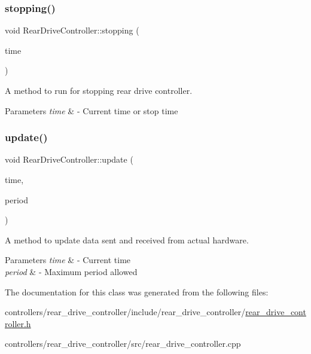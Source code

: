 \subsubsection{\texorpdfstring{stopping()}{stopping()}}
{\footnotesize\ttfamily void Rear\+Drive\+Controller\+::stopping (\begin{DoxyParamCaption}\item[{const ros\+::\+Time \&}]{time }\end{DoxyParamCaption})\hspace{0.3cm}{\ttfamily [inline]}}



A method to run for stopping rear drive controller. 


\begin{DoxyParams}{Parameters}
{\em time} & -\/ Current time or stop time \\
\hline
\end{DoxyParams}
\mbox{\label{classRearDriveController_a1990896d6d56922ed2f0d3097a9ea5e4}} 
\subsubsection{\texorpdfstring{update()}{update()}}
{\footnotesize\ttfamily void Rear\+Drive\+Controller\+::update (\begin{DoxyParamCaption}\item[{const ros\+::\+Time \&}]{time,  }\item[{const ros\+::\+Duration \&}]{period }\end{DoxyParamCaption})}



A method to update data sent and received from actual hardware. 


\begin{DoxyParams}{Parameters}
{\em time} & -\/ Current time \\
\hline
{\em period} & -\/ Maximum period allowed \\
\hline
\end{DoxyParams}


The documentation for this class was generated from the following files\+:\begin{DoxyCompactItemize}
\item 
controllers/rear\+\_\+drive\+\_\+controller/include/rear\+\_\+drive\+\_\+controller/\hyperlink{rear__drive__controller_8h}{rear\+\_\+drive\+\_\+controller.\+h}\item 
controllers/rear\+\_\+drive\+\_\+controller/src/rear\+\_\+drive\+\_\+controller.\+cpp\end{DoxyCompactItemize}
